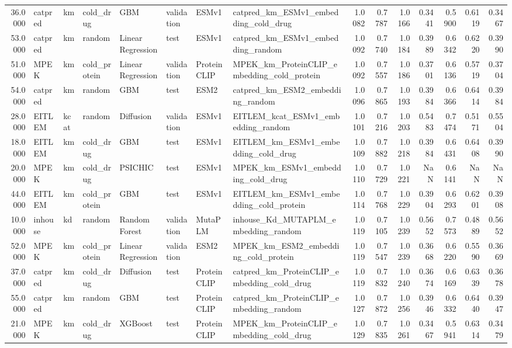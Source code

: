 \begin{tabular}{rlllllllrrrrrrr}
36.0000 & catpred & km & cold_drug & GBM & validation & ESMv1 & catpred_km_ESMv1_embedding_cold_drug & 1.0082 & 0.7787 & 1.0166 & 0.3441 & 0.5900 & 0.6119 & 0.3467 \\
53.0000 & catpred & km & random & Linear Regression & test & ESMv1 & catpred_km_ESMv1_embedding_random & 1.0092 & 0.7740 & 1.0184 & 0.3989 & 0.6342 & 0.6220 & 0.3990 \\
51.0000 & MPEK & km & cold_protein & Linear Regression & validation & ProteinCLIP & MPEK_km_ProteinCLIP_embedding_cold_protein & 1.0092 & 0.7557 & 1.0186 & 0.3701 & 0.6136 & 0.5719 & 0.3704 \\
54.0000 & catpred & km & random & GBM & test & ESM2 & catpred_km_ESM2_embedding_random & 1.0096 & 0.7865 & 1.0193 & 0.3984 & 0.6366 & 0.6414 & 0.3984 \\
28.0000 & EITLEM & kcat & random & Diffusion & validation & ESMv1 & EITLEM_kcat_ESMv1_embedding_random & 1.0101 & 0.7216 & 1.0203 & 0.5483 & 0.7474 & 0.5171 & 0.5504 \\
18.0000 & EITLEM & km & cold_drug & GBM & test & ESMv1 & EITLEM_km_ESMv1_embedding_cold_drug & 1.0109 & 0.7882 & 1.0218 & 0.3984 & 0.6431 & 0.6408 & 0.3990 \\
20.0000 & MPEK & km & cold_drug & PSICHIC & test & ESMv1 & MPEK_km_ESMv1_embedding_cold_drug & 1.0110 & 0.7729 & 1.0221 & NaN & 0.6141 & NaN & NaN \\
44.0000 & EITLEM & km & cold_protein & GBM & test & ESMv1 & EITLEM_km_ESMv1_embedding_cold_protein & 1.0114 & 0.7768 & 1.0229 & 0.3904 & 0.6293 & 0.6201 & 0.3908 \\
10.0000 & inhouse & kd & random & Random Forest & validation & MutaPLM & inhouse_Kd_MUTAPLM_embedding_random & 1.0119 & 0.7105 & 1.0239 & 0.5652 & 0.7573 & 0.4889 & 0.5652 \\
52.0000 & MPEK & km & cold_protein & Linear Regression & validation & ESM2 & MPEK_km_ESM2_embedding_cold_protein & 1.0119 & 0.7547 & 1.0239 & 0.3668 & 0.6220 & 0.5590 & 0.3669 \\
37.0000 & catpred & km & cold_drug & Diffusion & test & ProteinCLIP & catpred_km_ProteinCLIP_embedding_cold_drug & 1.0119 & 0.7832 & 1.0240 & 0.3674 & 0.6169 & 0.6339 & 0.3678 \\
55.0000 & catpred & km & random & GBM & test & ProteinCLIP & catpred_km_ProteinCLIP_embedding_random & 1.0127 & 0.7872 & 1.0256 & 0.3946 & 0.6332 & 0.6440 & 0.3947 \\
21.0000 & MPEK & km & cold_drug & XGBoost & test & ProteinCLIP & MPEK_km_ProteinCLIP_embedding_cold_drug & 1.0129 & 0.7835 & 1.0261 & 0.3467 & 0.5941 & 0.6314 & 0.3479 \\

\end{tabular}
